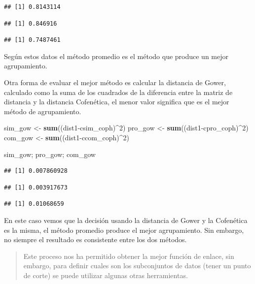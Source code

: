 \documentclass[]{book}
\newenvironment{Shaded}{\begin{snugshade}}{\end{snugshade}}
\newcommand{\KeywordTok}[1]{\textcolor[rgb]{0.13,0.29,0.53}{\textbf{{#1}}}}
\newcommand{\DecValTok}[1]{\textcolor[rgb]{0.00,0.00,0.81}{{#1}}}
\newcommand{\StringTok}[1]{\textcolor[rgb]{0.31,0.60,0.02}{{#1}}}
\newcommand{\NormalTok}[1]{{#1}}
\begin{document}
\begin{verbatim}
## [1] 0.8143114
\end{verbatim}

\begin{verbatim}
## [1] 0.846916
\end{verbatim}

\begin{verbatim}
## [1] 0.7487461
\end{verbatim}

Según estos datos el método promedio es el método que produce un mejor
agrupamiento.

Otra forma de evaluar el mejor método es calcular la distancia de Gower,
calculado como la suma de los cuadrados de la diferencia entre la matriz
de distancia y la distancia Cofenética, el menor valor significa que es
el mejor método de agrupamiento.

\begin{Shaded}
\begin{Highlighting}[]
\NormalTok{sim_gow <-}\StringTok{ }\KeywordTok{sum}\NormalTok{((dist1-csim_coph)^}\DecValTok{2}\NormalTok{)}
\NormalTok{pro_gow <-}\StringTok{ }\KeywordTok{sum}\NormalTok{((dist1-cpro_coph)^}\DecValTok{2}\NormalTok{)}
\NormalTok{com_gow <-}\StringTok{ }\KeywordTok{sum}\NormalTok{((dist1-ccom_coph)^}\DecValTok{2}\NormalTok{)}

\NormalTok{sim_gow; pro_gow; com_gow}
\end{Highlighting}
\end{Shaded}

\begin{verbatim}
## [1] 0.007860928
\end{verbatim}

\begin{verbatim}
## [1] 0.003917673
\end{verbatim}

\begin{verbatim}
## [1] 0.01068659
\end{verbatim}

En este caso vemos que la decisión usando la distancia de Gower y la
Cofenética es la misma, el método promedio produce el mejor
agrupamiento. Sin embargo, no siempre el resultado es consistente entre
los dos métodos.

\begin{quote}
Este proceso nos ha permitido obtener la mejor función de enlace, sin
embargo, para definir cuales son los subconjuntos de datos (tener un
punto de corte) se puede utilizar algunas otras herramientas.
\end{quote}
\end{document}
